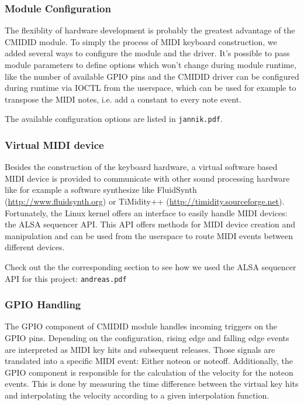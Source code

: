 \documentclass[paper=a4,fontsize=11pt,twocolumn,pagesize,bibtotoc]{scrartcl}
\begin{document}
\subsubsection{Module Configuration}
\label{cmidid:configuration}

The flexiblity of hardware development is probably the greatest advantage of 
the CMIDID module. To simply the process of MIDI keyboard construction, we 
added several ways to configure the module and the driver. It's possible to 
pass module parameters to define options which won't change during module 
runtime, like the number of available GPIO pins and the CMIDID driver can 
be configured during runtime via IOCTL from the userspace, which can be used 
for example to transpose the MIDI notes, i.e. add a constant to every note 
event.

The available configuration options are listed in \texttt{jannik.pdf}.

\subsubsection{Virtual MIDI device}
\label{cmidid:midi}

Besides the construction of the keyboard hardware, a virtual software based 
MIDI device is provided to communicate with other sound processing hardware 
like for example a software synthesize like FluidSynth 
(\url{http://www.fluidsynth.org}) or TiMidity++ 
(\url{http://timidity.sourceforge.net}). Fortunately, the Linux kernel 
offers an interface to easily handle MIDI devices: the ALSA sequencer API.
This API offers methods for MIDI 
device creation and manipulation and can be used from the userspace to 
route MIDI events between different devices.

Check out the the corresponding section to see how we used the ALSA sequencer API for
 this project: \texttt{andreas.pdf}

\subsubsection{GPIO Handling}
\label{cmidid:gpio}

The GPIO component of CMIDID module handles incoming triggers on the GPIO 
pins. Depending on the configuration, rising edge and falling edge events 
are interpreted as MIDI key hits and subsequent releases. Those signals are 
translated into a specific MIDI event: Either noteon or noteoff. Additionally, 
the GPIO component is responsible for the calculation of the velocity for 
the noteon events. This is done by measuring the time difference between 
the virtual key hits and interpolating the velocity according to a given 
interpolation function.
\end{document}
